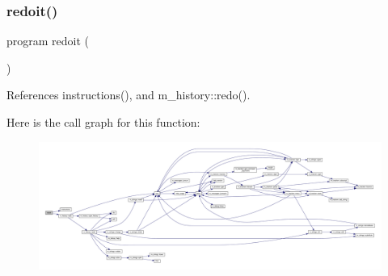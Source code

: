 \subsubsection{\texorpdfstring{redoit()}{redoit()}}
{\footnotesize\ttfamily program redoit (\begin{DoxyParamCaption}{ }\end{DoxyParamCaption})}



References instructions(), and m\+\_\+history\+::redo().

Here is the call graph for this function\+:
\nopagebreak
\begin{figure}[H]
\begin{center}
\leavevmode
\includegraphics[width=350pt]{redo_8f90_a4f300f7db1b9163c705b941bcd47d4f9_cgraph}
\end{center}
\end{figure}
